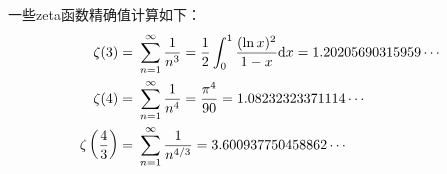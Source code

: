 \begin{itemize}[leftmargin=\inteval{\myitemleftmargin}pt,itemsep=
   \inteval{\myitemitempsep}pt,topsep=\inteval{\myitemtopsep}pt]
%
%
\noindent 一些zeta函数精确值计算如下：
\begin{align*}
    \zeta(3)=&\ \sum_{n=1}^{\infty} \dfrac{1}{n^3}=\dfrac{1}{2}\int_0^1 \dfrac{(\ln x)^2}{1-x}\d x=1.20205690315959\cdots \\
    \zeta(4)=&\ \sum_{n=1}^{\infty} \dfrac{1}{n^4}=\dfrac{\pi^4}{90}
    =1.08232323371114\cdots     \\ 
    \zeta\left(\dfrac{4}{3}\right)=&\ \sum_{n=1}^{\infty} \dfrac{1}{n^{4/3}}=
    3.600937750458862 \cdots\\

\end{align*}
\end{itemize}

